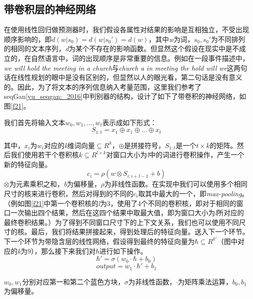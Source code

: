 \documentclass[12pt]{template}
\begin{document}
\subsection{带卷积层的神经网络}
在使用线性回归做预测器时，我们假设各属性对结果的影响是互相独立，不受出现顺序影响的，即\(d(w|s_0)=d(w|s_0')=d(w)\)，其中\textit{w}为词，\(s_0,s_0'\)为不同排列的相同的文本序列，\textit{d}为某个不存在的影响函数。但显然这个假设在现实中是不成立的，在自然语言中，词的出现顺序是非常重要的信息。例如在一段事件描述中，\textit{we will hold the meeting in a church}与\textit{church a in meeting the hold will we}这两句话在线性规划的眼中是没有区别的，但显然以人的眼光看，第二句话是没有意义的。因此，为了将文本的序列信息纳入考量范围，这里我们参考了seqGan\ref{yu_seqgan:_2016}中判别器的结构，设计了如下了带卷积的神经网络，如图\ref{f21}。

我们首先将输入文本\(w_0,w_1,...,w_t\)表示成如下形式：
\begin{equation}
S_{1:t}=x_1\oplus x_1\oplus...\oplus x_t
\end{equation}

其中，\(x_i\)为\(w_i\)对应的\textit{k}维词向量\(\subseteq R^k\)，\(\oplus\)是拼接符号，\(S_{1:t}\)是一个\(t\times k\)的矩阵。然后我们使用若干个卷积核\(k\subseteq R^{l\times k}\)对窗口大小为\textit{l}中的词进行卷积操作，产生一个新的特征向量。
\begin{equation}
c_i=\rho(w\otimes S_{i:i+l-1}+b)
\end{equation}
\(\otimes\)为元素乘积之和，\textit{b}为偏移量，\(\rho\)为非线性函数。在实现中我们可以使用多个相同尺寸的核来进行卷积，然后对得到的不同的\(c_i\)取其中最大的一个，即\textit{max-pooling}。（例如图\ref{f21}中第一个卷积核的\textit{l}为3，使用了4个不同的卷积核，即对于相同的窗口一次输出四个结果，然后在这四个结果中取最大值，即为窗口大小为\textit{l}所对应的最终卷积结果。）为了得到不同窗口尺寸下的上下文关系，我们也可以使用不同尺寸的核。最后，我们将结果拼接起来，得到处理后的特征向量。送入下一个环节。下一个环节为带隐含层的线性网络，假设得到最终的特征向量为\(\hbar\subseteq R^{k'}\)（图中对应的\textit{k}为9），那么接下来我们对\(\hbar\)进行如下操作。
\begin{equation}
\hbar'=\sigma(w_0\cdot\hbar+b_0)
\end{equation}
\begin{equation}
output = w_1\cdot\hbar'+b_1
\end{equation}

\(w_0,w_1\)分别对应第一和第二个蓝色方块，\(\sigma\)为非线性函数，\(\cdot\)为矩阵乘法运算，\(b_0,b_1\)为偏移量。
\end{document}

